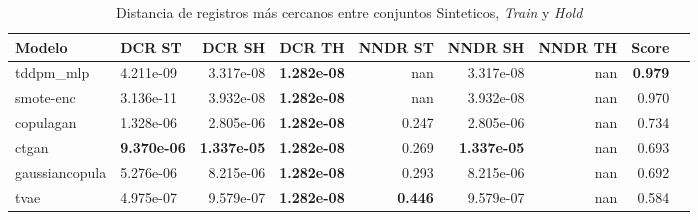 \begin{table}[H]
\centering
\caption{Distancia de registros más cercanos entre conjuntos Sinteticos, \emph{Train} y \emph{Hold}}
\label{table-dcr-economicos-a-3}
\begin{tabular}{|l|l|r|r|r|r|r|r|r|}
\hline
\rowcolor[gray]{0.8}
Modelo & DCR ST & DCR SH & DCR TH & NNDR ST & NNDR SH & NNDR TH & \textbf{Score} \\
\hline tddpm\_mlp & 4.211e-09 & \cellcolor[rgb]{0.9, 0.54, 0.52} 3.317e-08 & \bfseries 1.282e-08 & nan & 3.317e-08 & nan & \bfseries 0.979 \\
\hline smote-enc & \cellcolor[rgb]{0.9, 0.54, 0.52} 3.136e-11 & 3.932e-08 & \bfseries 1.282e-08 & nan & 3.932e-08 & nan & 0.970 \\
\hline copulagan & 1.328e-06 & 2.805e-06 & \bfseries 1.282e-08 & 0.247 & 2.805e-06 & nan & 0.734 \\
\hline ctgan & \bfseries 9.370e-06 & \bfseries 1.337e-05 & \bfseries 1.282e-08 & 0.269 & \bfseries 1.337e-05 & nan & 0.693 \\
\hline gaussiancopula & 5.276e-06 & 8.215e-06 & \bfseries 1.282e-08 & 0.293 & 8.215e-06 & nan & 0.692 \\
\hline tvae & 4.975e-07 & 9.579e-07 & \bfseries 1.282e-08 & \bfseries 0.446 & 9.579e-07 & nan & 0.584 \\
\hline
\end{tabular}
\end{table}
